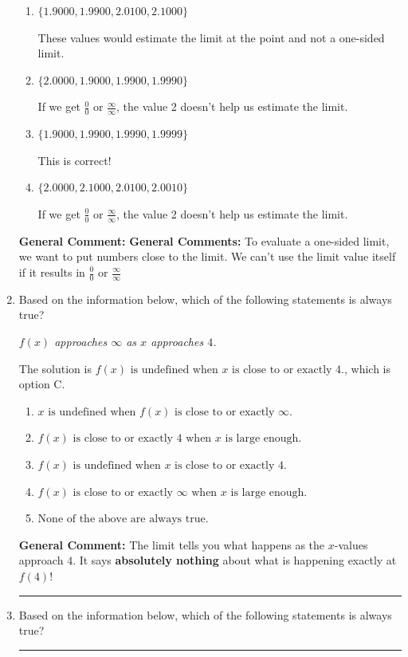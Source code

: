 \documentclass{extbook}[14pt]
\newcommand{\litem}[1]{\item #1

\rule{\textwidth}{0.4pt}}
\begin{document}
\begin{enumerate}
{\begin{enumerate}[label=\Alph*.]
These values would estimate the limit of 2 on the right.
\item \( \{ 1.9000, 1.9900, 2.0100, 2.1000 \} \)

These values would estimate the limit at the point and not a one-sided limit.
\item \( \{ 2.0000, 1.9000, 1.9900, 1.9990 \} \)

If we get $\frac{0}{0}$ or $\frac{\infty}{\infty}$, the value 2 doesn't help us estimate the limit.
\item \( \{ 1.9000, 1.9900, 1.9990, 1.9999 \} \)

This is correct!
\item \( \{ 2.0000, 2.1000, 2.0100, 2.0010 \} \)

If we get $\frac{0}{0}$ or $\frac{\infty}{\infty}$, the value 2 doesn't help us estimate the limit.
\end{enumerate}

\textbf{General Comment:} \textbf{General Comments:} To evaluate a one-sided limit, we want to put numbers close to the limit. We can't use the limit value itself if it results in $\frac{0}{0}$ or $\frac{\infty}{\infty}$
}
\litem{
Based on the information below, which of the following statements is always true?

\begin{center}
    \textit{ $f(x)$ approaches $\infty$ as $x$ approaches $4$. }
\end{center}
The solution is \( f(x) \text{ is undefined when } x \text{ is close to or exactly } 4. \), which is option C.\begin{enumerate}[label=\Alph*.]
\item \( x \text{ is undefined when } f(x) \text{ is close to or exactly } \infty. \)


\item \( f(x) \text{ is close to or exactly } 4 \text{ when } x \text{ is large enough}. \)


\item \( f(x) \text{ is undefined when } x \text{ is close to or exactly } 4. \)


\item \( f(x) \text{ is close to or exactly } \infty \text{ when } x \text{ is large enough}. \)


\item \( \text{None of the above are always true.} \)


\end{enumerate}

\textbf{General Comment:} The limit tells you what happens as the $x$-values approach $4$. It says \textbf{absolutely nothing} about what is happening exactly at $f(4)$!
}
\litem{
Based on the information below, which of the following statements is always true?

}
\end{enumerate}
\end{document}
